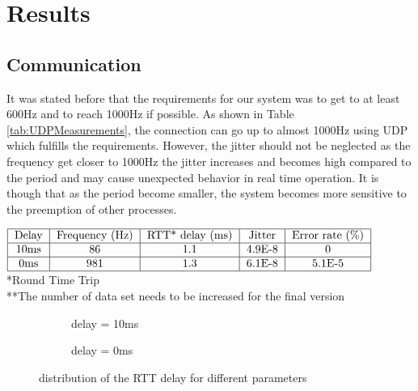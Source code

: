 \section{Results}

\subsection{Communication}

 It was stated before that the requirements for our system was to get to at least 600Hz and to reach 1000Hz if possible. As shown in Table \ref{tab:UDPMeasurements}, the connection can go up to almost 1000Hz using UDP which fulfills the requirements. However, the jitter should not be neglected as the frequency get closer to 1000Hz the jitter increases and becomes high compared to the period and may cause unexpected behavior in real time operation. It is though that as the period become smaller, the system becomes more sensitive to the preemption of other processes.
\begin{table}[h]
  $\begin{tabular}{|c|c|c|c|c|c|}
    \hline
    \text{Delay} & \text{Frequency (Hz)} & \text{RTT* delay (ms)} & \text{Jitter} & \text{Error rate (\%)}\\
    \hline
    10ms & 86 & 1.1 & 4.9E-8 & 0 \\
    \hline
    0ms & 981 & 1.3 & 6.1E-8 & 5.1E-5 \\
    \hline
  \end{tabular}$
  *Round Time Trip\\
  **The number of data set needs to be increased for the final version
  \caption{UDP**}
  \label{tab:UDPMeasurements}
\end{table}



\begin{figure}[h]
  \centering
  \begin{subfigure}{.45\linewidth}
    \centering
   
    
    \caption{delay = 10ms}
    \label{fig:10ms}
  \end{subfigure}
  \begin{subfigure}{.45\linewidth}
    \centering

    
    \caption{delay = 0ms}
    \label{fig:0ms}
  \end{subfigure}
\caption{distribution of the RTT delay for different parameters}
\label{fig:histograms}
\end{figure}






